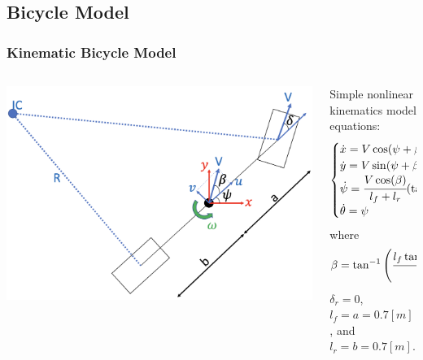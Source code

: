\documentclass[aspectratio=169]{beamer}
\begin{document}
\subsection{Bicycle Model}

\begin{frame}
	\frametitle{Kinematic Bicycle Model}

	\begin{columns}
		\begin{column}{0.4\textwidth}
			\includegraphics[width=\columnwidth]{figs/BicycleModel.png}
		\end{column}
		\begin{column}{0.5\textwidth}
			Simple nonlinear kinematics model equations:
			\begin{equation}
				\begin{cases}
					\dot{x} = V \cos(\psi + \beta)\\
					\dot{y} = V \sin(\psi + \beta)\\
					\dot{\psi} = \cfrac{V \cos(\beta)}{l_f + l_r} \qty(\tan(\delta_f) - \tan(\delta_r))\\
					\dot{\theta} = \psi
				\end{cases}
			\end{equation}
			where
			\begin{equation}
				\beta = \tan^{-1}\qty(\cfrac{l_f \tan(\delta_r) + l_r \tan(\delta_f)}{l_f + l_r})
			\end{equation}
			$\delta_r = 0$, $l_f = a = 0.7 [m]$, and $l_r = b = 0.7 [m]$.
		\end{column}
	\end{columns}

\end{frame}
\end{document}
